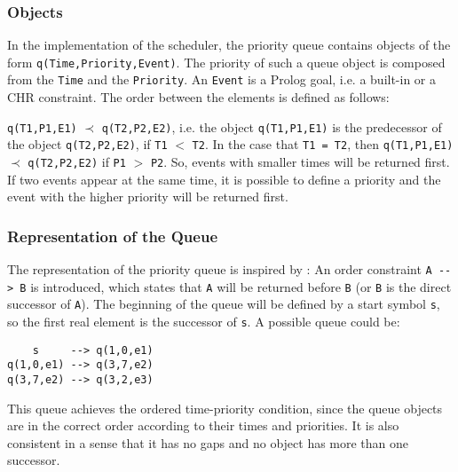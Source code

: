 \subsubsection{Objects}

In the implementation of the scheduler, the priority queue contains objects of the form \lstinline|q(Time,Priority,Event)|. The priority of such a queue object is composed from the \lstinline|Time| and the \lstinline|Priority|. An \lstinline|Event| is a Prolog goal, i.e. a built-in or a CHR constraint. The order between the elements is defined as follows:

\begin{definition}
\label{def:time-priority-condition}
\lstinline|q(T1,P1,E1)| $\prec$ \lstinline|q(T2,P2,E2)|, i.e. the object \lstinline|q(T1,P1,E1)| is the predecessor of the object \lstinline|q(T2,P2,E2)|, if \lstinline|T1| $<$ \lstinline|T2|. In the case that \lstinline|T1 = T2|, then \lstinline|q(T1,P1,E1)| $\prec$ \lstinline|q(T2,P2,E2)| if \lstinline|P1| $>$ \lstinline|P2|. So, events with smaller times will be returned first. If two events appear at the same time, it is possible to define a priority and the event with the higher priority will be returned first. 
\end{definition}

\subsubsection{Representation of the Queue}

The representation of the priority queue is inspired by \cite[38\psqq]{fru_chr_book_2009}: An order constraint \lstinline|A --> B| is introduced, which states that \lstinline|A| will be returned before \lstinline|B| (or \lstinline|B| is the direct successor of \lstinline|A|). The beginning of the queue will be defined by a start symbol \lstinline|s|, so the first real element is the successor of \lstinline|s|. A possible queue could be:

\begin{lstlisting}
    s     --> q(1,0,e1)
q(1,0,e1) --> q(3,7,e2)
q(3,7,e2) --> q(3,2,e3)
\end{lstlisting}

This queue achieves the ordered time-priority condition, since the queue objects are in the correct order according to their times and priorities. It is also consistent in a sense that it has no gaps and no object has more than one successor.

